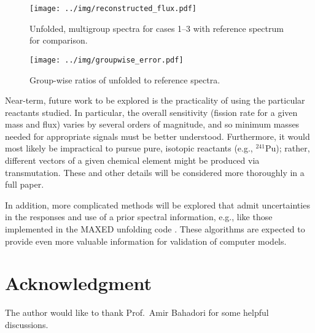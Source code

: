 \documentclass[journal]{IEEEtran}
\begin{document}
\begin{figure}[h!tb]
  \centering
  \texttt{[image: ../img/reconstructed\_flux.pdf]}
  \caption{Unfolded, multigroup spectra for cases 1--3 with reference spectrum for comparison.}
  \label{fig:unfolded_spectra}
\end{figure}

\begin{figure}[h!tb]
  \centering
  \texttt{[image: ../img/groupwise\_error.pdf]}
  \caption{Group-wise ratios of unfolded to 
  reference spectra.}
  \label{fig:error}
\end{figure}

Near-term, future work to be explored is the practicality of using the particular reactants studied.  In particular, the overall sensitivity (fission rate for a given mass and flux) varies by several orders of magnitude, and so minimum masses needed for appropriate signals must be better understood.  Furthermore, it would most likely be impractical to pursue pure, isotopic reactants (e.g., ${}^{241}$Pu); rather, different vectors of a given chemical element might be produced via transmutation.  These and other details will be considered more thoroughly in a full paper.

In addition, more complicated methods will be explored that admit uncertainties in the responses and use of a prior spectral information, e.g., like those implemented in the MAXED unfolding code \cite{reginatto1999maxed, reginatto2002spectrum}.  These algorithms  are expected to provide even more valuable information for validation of computer models.



 
\section*{Acknowledgment}


The author would like to thank Prof.~Amir Bahadori for some helpful discussions.


\ifCLASSOPTIONcaptionsoff
  \newpage
\fi



\end{document}
